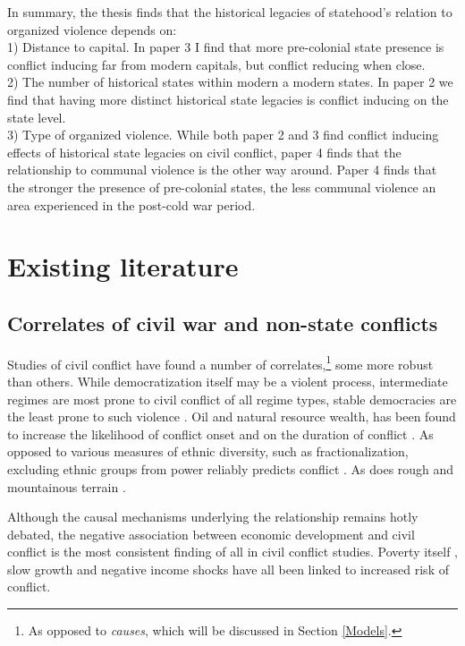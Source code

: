 In summary, the thesis finds that the historical legacies of statehood's
relation to organized violence depends on:\\

1) Distance to capital. In paper 3 I find that more pre-colonial state presence
is conflict inducing far from modern capitals, but conflict reducing when
close.\\

2) The number of historical states within modern a modern states. In paper 2 we
find that having more distinct historical state legacies is conflict inducing on
the state level.\\

3) Type of organized violence. While both paper 2 and 3 find conflict inducing
effects of historical state legacies on civil conflict, paper 4 finds that the
relationship to communal violence is the other way around. Paper 4 finds that
the stronger the presence of pre-colonial states, the less communal violence an
area experienced in the post-cold war period.

\section{Existing literature} \label{Existing literature}

\subsection{Correlates of civil war and non-state conflicts} 
\label{Correlates of civil war and non-state conflicts}

Studies of civil conflict have found a number of correlates,\footnote{As opposed
to \textit{causes}, which will be discussed in Section \ref{Models}.} some more robust
than others. While democratization itself may be a violent process, intermediate
regimes are most prone to civil conflict of all regime types, stable democracies
are the least prone to such violence \citep{Hegre2001, Goldstone_2010}. 
Oil and natural resource wealth, has been found to increase the likelihood of
conflict onset and on the duration of conflict \citep{Lujala2010, Lujala2005,
Lujala_2008, Ross_2006}. As opposed to various measures of ethnic diversity,
such as fractionalization, excluding ethnic groups from power reliably predicts
conflict \citep{CedermanLars-Erik2013Igac}. As does rough and mountainous
terrain \citep{Buhaug_2010, Hegre2006}.

Although the causal mechanisms underlying the relationship remains hotly debated,
the negative association between economic development and civil conflict is the
most consistent finding of all in civil conflict studies. Poverty itself
\citep{Hegre2006}, slow growth \citep{Hegre2006} and negative income shocks have
all been linked to increased risk of conflict.

